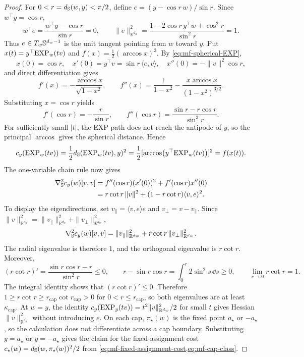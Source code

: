 \begin{proof}
For \(0<r=d_{\mathbb{S}}(w,y)<\pi/2\), define
\(e=(y-\cos r\,w)/\sin r\).  Since \(w^\top y=\cos r\),
\[
 w^\top e=\frac{w^\top y-\cos r}{\sin r}=0,
 \qquad
 \|e\|_{\mathbb R^{d_w}}^2
 =\frac{1-2\cos r\,y^\top w+\cos^2r}{\sin^2r}=1.
\]
Thus \(e\in T_w\mathbb{S}^{d_w-1}\) is the unit tangent pointing from \(w\)
toward \(y\).
Put \(x(t)=y^\top\mathrm{EXP}_w(tv)\) and \(f(x)=\tfrac12(\arccos x)^2\).
By \cref{eq:mf-spherical-EXP},
\[
 x(0)=\cos r,\quad x'(0)=y^\top v=\sin r\,\langle e,v\rangle,
 \quad x''(0)=-\|v\|^2\cos r,
\]
and direct differentiation gives
\[
 f'(x)=-\frac{\arccos x}{\sqrt{1-x^2}},\qquad
 f''(x)=\frac1{1-x^2}
        -\frac{x\arccos x}{(1-x^2)^{3/2}}.
\]
Substituting \(x=\cos r\) yields
\[
 f'(\cos r)=-\frac r{\sin r},\qquad
 f''(\cos r)=\frac{\sin r-r\cos r}{\sin^3r}.
\]
For sufficiently small \(|t|\), the EXP path does not reach the antipode of
\(y\), so the principal \(\arccos\) gives the spherical distance.  Hence
\[
 c_y(\mathrm{EXP}_w(tv))
 =\frac12d_{\mathbb{S}}(\mathrm{EXP}_w(tv),y)^2
 =\frac12[\arccos(y^\top\mathrm{EXP}_w(tv))]^2
 =f(x(t)).
\]
The one-variable chain rule now gives
\begin{equation}
\label{eq:mf-spherical-cost-Hessian-formula}
\begin{aligned}
 \nabla_{\mathbb{S}}^2c_y(w)[v,v]
 &=f''(\cos r)(x'(0))^2+f'(\cos r)x''(0)\\
 &=r\cot r\,\|v\|^2+(1-r\cot r)\langle v,e\rangle^2.
\end{aligned}
\end{equation}
To display the eigendirections, set
\(v_\parallel=\langle v,e\rangle e\) and
\(v_\perp=v-v_\parallel\).  Since
\(\|v\|_{\mathbb R^{d_w}}^2=\|v_\parallel\|_{\mathbb R^{d_w}}^2+
\|v_\perp\|_{\mathbb R^{d_w}}^2\),
\[
 \nabla_{\mathbb{S}}^2c_y(w)[v,v]
 =\|v_\parallel\|_{\mathbb R^{d_w}}^2
  +r\cot r\,\|v_\perp\|_{\mathbb R^{d_w}}^2.
\]
The radial eigenvalue is therefore \(1\), and the orthogonal eigenvalue is
\(r\cot r\). Moreover,
\[
 (r\cot r)'=\frac{\sin r\cos r-r}{\sin^2r}\le0,\qquad
 r-\sin r\cos r=\int_0^r2\sin^2s\,\dd s\ge0,
 \qquad \lim_{r\to0}r\cot r=1.
\]
The integral identity shows that \((r\cot r)'\le0\).  Therefore
\(1\ge r\cot r\ge r_{\mathrm{cap}}\cot r_{\mathrm{cap}}>0\) for
\(0<r\le r_{\mathrm{cap}}\), so both eigenvalues are at least
\(\kappa_{\mathrm{cap}}\).
At \(w=y\), the identity
\(c_y(\mathrm{EXP}_y(tv))=t^2\|v\|_{\mathbb R^{d_w}}^2/2\) for small \(t\)
gives Hessian \(\|v\|_{\mathbb R^{d_w}}^2\) without introducing \(e\).
On each cap, \(\pi_\star(w)\) is the fixed point \(a_\star\) or
\(-a_\star\), so the calculation does not differentiate across a cap
boundary.  Substituting
\(y=a_\star\) or \(y=-a_\star\) gives the claim for the fixed-assignment
cost \(c_\star(w)=d_{\mathbb{S}}(w,\pi_\star(w))^2/2\)
from \cref{eq:mf-fixed-assignment-cost,eq:mf-cap-class}.
\end{proof}


